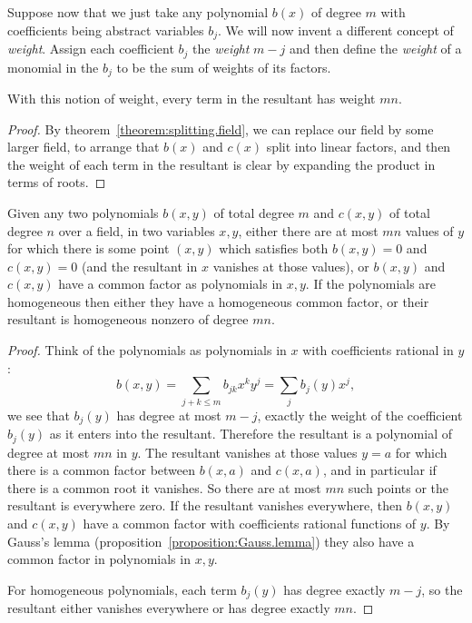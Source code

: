 Suppose now that we just take any polynomial \(b(x)\) of degree \(m\) with coefficients being abstract variables \(b_j\). 
We will now invent a different concept of \emph{weight}.
Assign each coefficient \(b_j\) the \emph{weight} \(m-j\) and then define the \emph{weight} of a monomial in the \(b_j\) to be  the sum of weights of its factors.
\begin{lemma}
With this notion of weight, every term in the resultant has weight \(mn\).
\end{lemma}
\begin{proof}
By theorem~\vref{theorem:splitting.field}, we can replace our field by some larger field, to arrange that \(b(x)\) and \(c(x)\) split into linear factors, and then the weight of each term in the resultant is clear by expanding the product in terms of roots.
\end{proof}
\begin{proposition}\label{proposition:resultant.degree}
Given any two polynomials \(b(x,y)\) of total degree \(m\) and \(c(x,y)\) of total degree \(n\) over a field, in two variables \(x,y\), either there are at most \(mn\) values of \(y\) for which there is some point \((x,y)\) which satisfies both \(b(x,y)=0\) and \(c(x,y)=0\) (and the resultant in \(x\) vanishes at those values), or \(b(x,y)\) and \(c(x,y)\) have a common factor as polynomials in \(x,y\).
If the polynomials are homogeneous then either they have a homogeneous common factor, or their resultant is homogeneous nonzero of degree \(mn\).
\end{proposition}
\begin{proof}
Think of the polynomials as polynomials in \(x\) with coefficients rational in \(y\):
\[
b(x,y)=\sum_{j+k \le m} b_{jk} x^k y^j=\sum_j b_j(y) x^j,
\]
we see that \(b_j(y)\) has degree at most \(m-j\), exactly the weight of the coefficient \(b_j(y)\) as it enters into the resultant.
Therefore the resultant is a polynomial of degree at most \(mn\) in \(y\).
The resultant vanishes at those values \(y=a\) for which there is a common factor between \(b(x,a)\) and \(c(x,a)\), and in particular if there is a common root it vanishes.
So there are at most \(mn\) such points or the resultant is everywhere zero.
If the resultant vanishes everywhere, then \(b(x,y)\) and \(c(x,y)\) have a common factor with coefficients rational functions of \(y\).
By Gauss's lemma (proposition~\vref{proposition:Gauss.lemma}) they also have a common factor in polynomials in \(x,y\). 

For homogeneous polynomials, each term \(b_j(y)\) has degree exactly \(m-j\), so the resultant either vanishes everywhere or has degree exactly \(mn\).
\end{proof}
